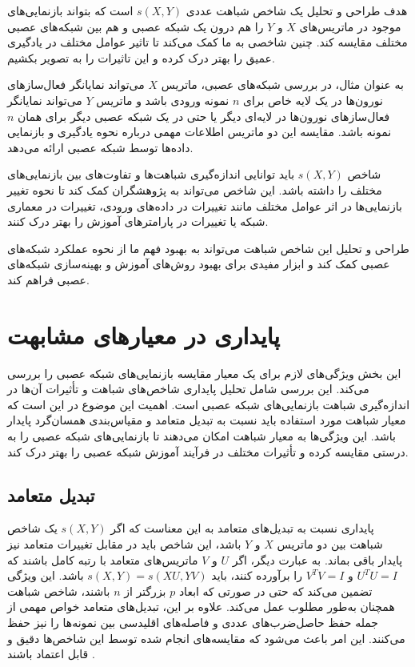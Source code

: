 هدف طراحی و تحلیل یک شاخص شباهت عددی \( s(X, Y) \) است که بتواند بازنمایی‌های%
موجود در ماتریس‌های \( X \) و \( Y \) را هم درون یک شبکه عصبی و هم بین شبکه‌های عصبی مختلف مقایسه کند. چنین شاخصی به ما کمک می‌کند تا تاثیر عوامل مختلف در یادگیری عمیق را بهتر درک کرده و این تاثیرات را به تصویر بکشیم.

به عنوان مثال، در بررسی شبکه‌های عصبی، ماتریس \( X \) می‌تواند نمایانگر فعال‌سازهای%
نورون‌ها در یک لایه خاص برای \( n \) نمونه ورودی باشد و ماتریس \( Y \) می‌تواند نمایانگر فعال‌سازهای نورون‌ها در لایه‌ای دیگر یا حتی در یک شبکه عصبی دیگر برای همان \( n \) نمونه باشد. مقایسه این دو ماتریس اطلاعات مهمی درباره نحوه یادگیری و بازنمایی داده‌ها توسط شبکه عصبی ارائه می‌دهد.

شاخص \( s(X, Y) \) باید توانایی اندازه‌گیری شباهت‌ها و تفاوت‌های بین بازنمایی‌های مختلف را داشته باشد. این شاخص می‌تواند به پژوهشگران کمک کند تا نحوه تغییر بازنمایی‌ها در اثر عوامل مختلف مانند تغییرات در داده‌های ورودی، تغییرات در معماری شبکه یا تغییرات در پارامترهای آموزش را بهتر درک کنند.

طراحی و تحلیل این شاخص شباهت می‌تواند به بهبود فهم ما از نحوه عملکرد شبکه‌های عصبی کمک کند و ابزار مفیدی برای بهبود روش‌های آموزش و بهینه‌سازی شبکه‌های عصبی فراهم کند.



\section{پایداری در معیارهای مشابهت}
این بخش ویژگی‌های لازم برای یک معیار مقایسه بازنمایی‌های شبکه عصبی را بررسی می‌کند. این بررسی شامل تحلیل پایداری شاخص‌های شباهت و تأثیرات آن‌ها در اندازه‌گیری شباهت بازنمایی‌های شبکه عصبی است. اهمیت این موضوع در این است که معیار شباهت مورد استفاده باید نسبت به تبدیل متعامد%
و مقیاس‌بندی همسان‌گرد%
پایدار باشد. این ویژگی‌ها به معیار شباهت امکان می‌دهند تا بازنمایی‌های شبکه عصبی را به درستی مقایسه کرده و تأثیرات مختلف در فرآیند آموزش شبکه عصبی را بهتر درک کند.


\subsection{تبدیل متعامد}

پایداری نسبت به تبدیل‌های متعامد به این معناست که اگر \( s(X, Y) \) یک شاخص شباهت بین دو ماتریس \( X \) و \( Y \) باشد، این شاخص باید در مقابل تغییرات متعامد نیز پایدار باقی بماند. به عبارت دیگر، اگر \( U \) و \( V \) ماتریس‌های متعامد با رتبه کامل%
باشند که \( U^TU = I \) و \( V^TV = I \) را برآورده کنند، باید \( s(X, Y) = s(XU, YV) \) باشد. این ویژگی تضمین می‌کند که حتی در صورتی که ابعاد \( p \) بزرگتر از \( n \) باشند، شاخص شباهت همچنان به‌طور مطلوب عمل می‌کند. علاوه بر این، تبدیل‌های متعامد خواص مهمی از جمله حفظ حاصل‌ضرب‌های عددی و فاصله‌های اقلیدسی%
بین نمونه‌ها را نیز حفظ می‌کنند. این امر باعث می‌شود که مقایسه‌های انجام شده توسط این شاخص‌ها دقیق و قابل اعتماد باشند
\cite{kornblith2019similarity}.

